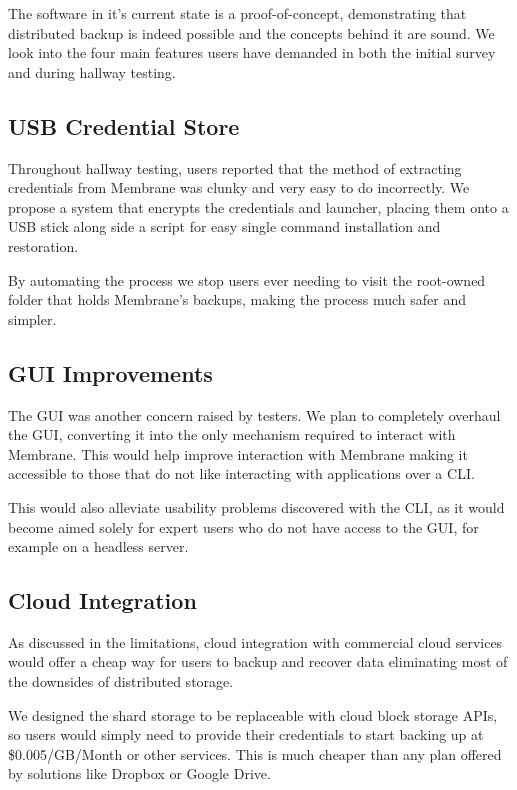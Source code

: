\documentclass[11pt, a4paper, twoside]{report}
\begin{document}
The software in it's current state is a proof-of-concept, demonstrating that distributed backup is indeed possible and the concepts behind it are sound. We look into the four main features users have demanded in both the initial survey and during hallway testing.

\subsection{USB Credential Store}

Throughout hallway testing, users reported that the method of extracting credentials from Membrane was clunky and very easy to do incorrectly. We propose a system that encrypts the credentials and launcher, placing them onto a USB stick along side a script for easy single command installation and restoration.

By automating the process we stop users ever needing to visit the root-owned folder that holds Membrane's backups, making the process much safer and simpler.

\subsection{GUI Improvements}

The GUI was another concern raised by testers. We plan to completely overhaul the GUI, converting it into the only mechanism required to interact with Membrane. This would help improve interaction with Membrane making it accessible to those that do not like interacting with applications over a CLI.

This would also alleviate usability problems discovered with the CLI, as it would become aimed solely for expert users who do not have access to the GUI, for example on a headless server.

\subsection{Cloud Integration}

As discussed in the limitations, cloud integration with commercial cloud services would offer a cheap way for users to backup and recover data eliminating most of the downsides of distributed storage.

We designed the shard storage to be replaceable with cloud block storage APIs, so users would simply need to provide their credentials to start backing up at \$0.005/GB/Month \citep{backblaze2017pricing} or other services. This is much cheaper than any plan offered by solutions like Dropbox or Google Drive.
\end{document}
